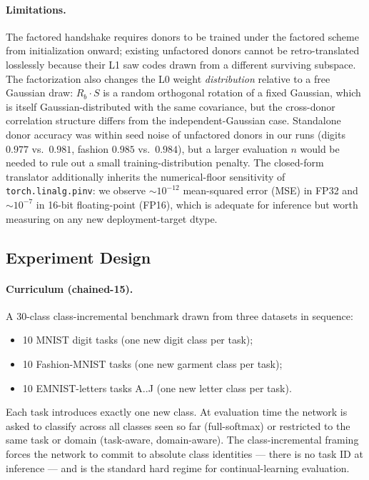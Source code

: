 \documentclass[11pt]{article}
\begin{document}
\paragraph{Limitations.}
The factored handshake requires donors to be trained under the
factored scheme from initialization onward; existing unfactored
donors cannot be retro-translated losslessly because their L1 saw
codes drawn from a different surviving subspace. The factorization
also changes the L0 weight \emph{distribution} relative to a free
Gaussian draw: $R_b \cdot S$ is a random orthogonal rotation of a
fixed Gaussian, which is itself Gaussian-distributed with the same
covariance, but the cross-donor correlation structure differs from
the independent-Gaussian case. Standalone donor accuracy was within
seed noise of unfactored donors in our runs (digits $0.977$ vs.\
$0.981$, fashion $0.985$ vs.\ $0.984$), but a larger evaluation
$n$ would be needed to rule out a small training-distribution
penalty. The closed-form translator additionally inherits the
numerical-floor sensitivity of \texttt{torch.linalg.pinv}: we observe
$\sim 10^{-12}$ mean-squared error (MSE) in FP32 and $\sim 10^{-7}$
in 16-bit floating-point (FP16), which is adequate for inference but
worth measuring on any new deployment-target dtype.

\subsection{Experiment Design}
\label{sec:experiment-design}\label{app:experiment-design}

\paragraph{Curriculum (chained-15).}
A 30-class class-incremental benchmark drawn from three datasets in
sequence:
\begin{itemize}[leftmargin=1.5em]
  \item 10 MNIST digit tasks (one new digit class per task);
  \item 10 Fashion-MNIST tasks (one new garment class per task);
  \item 10 EMNIST-letters tasks A..J (one new letter class per task).
\end{itemize}
Each task introduces exactly one new class. At evaluation time the
network is asked to classify across all classes seen so far
(full-softmax) or restricted to the same task or domain (task-aware,
domain-aware). The class-incremental framing forces the network to
commit to absolute class identities --- there is no task ID at
inference --- and is the standard hard regime for continual-learning
evaluation.
\end{document}
